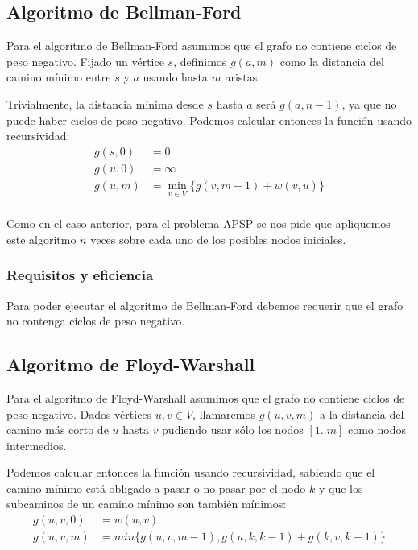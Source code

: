 \documentclass[a4paper, 11pt]{article} %
\begin{document}
  \subsection{Algoritmo de Bellman-Ford}
    Para el algoritmo de Bellman-Ford asumimos que el grafo no contiene ciclos de peso negativo.
    Fijado un vértice $s$, definimos $g(a,m)$ como la distancia del camino mínimo entre $s$ y $a$
    usando hasta $m$ aristas.
    
    Trivialmente, la distancia mínima desde $s$ hasta $a$ será $g(a,n-1)$, ya que no puede
    haber ciclos de peso negativo. Podemos calcular entonces la función usando recursividad:
    \begin{equation} 
      \begin{split}
	g(s,0)  &=  0 \\
	g(u,0)  &=  \infty \\
	g(u,m)  &=  \min_{v \in V} \{g(v,m-1) + w(v,u)\} \\
      \end{split}
    \end{equation}

    Como en el caso anterior, para el problema APSP se nos pide que apliquemos este algoritmo $n$ veces sobre cada uno
    de los posibles nodos iniciales.

    \subsubsection{Requisitos y eficiencia}
      Para poder ejecutar el algoritmo de Bellman-Ford debemos requerir que el grafo
      no contenga ciclos de peso negativo.
      
      
      
    \subsection{Algoritmo de Floyd-Warshall}
      Para el algoritmo de Floyd-Warshall asumimos que el grafo no contiene ciclos de peso negativo.
      Dados vértices $u,v \in V$, llamaremos $g(u,v,m)$ a la distancia del camino más corto de $u$
      hasta $v$ pudiendo usar sólo los nodos $[1..m]$ como nodos intermedios.
      
      Podemos calcular entonces la función usando recursividad, sabiendo que el
      camino mínimo está obligado a pasar o no pasar por el nodo $k$ y que los
      subcaminos de un camino mínimo son también mínimos:
      \begin{equation}
	\begin{split}
	g(u,v,0) &= w(u,v) \\
	g(u,v,m) &= min\{g(u,v,m-1), g(u,k,k-1)+g(k,v,k-1)\}
	\end{split}
      \end{equation}
    
\end{document}
